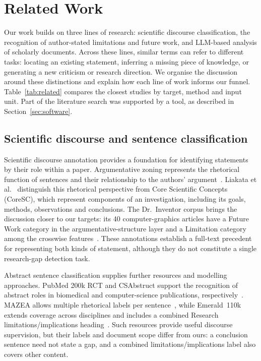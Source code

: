 \section{Related Work}
\label{sec:related}

Our work builds on three lines of research: scientific discourse classification, the recognition of author-stated limitations and future work, and LLM-based analysis of scholarly documents. Across these lines, similar terms can refer to different tasks: locating an existing statement, inferring a missing piece of knowledge, or generating a new criticism or research direction. We organise the discussion around these distinctions and explain how each line of work informs our funnel. Table~\ref{tab:related} compares the closest studies by target, method and input unit. Part of the literature search was supported by a tool, as described in Section~\ref{sec:software}.

\subsection{Scientific discourse and sentence classification}

Scientific discourse annotation provides a foundation for identifying statements by their role within a paper. Argumentative zoning represents the rhetorical function of sentences and their relationship to the authors' argument~\cite{teufel2002summarizing}. Liakata et al.~\cite{liakata2010corpora} distinguish this rhetorical perspective from Core Scientific Concepts (CoreSC), which represent components of an investigation, including its goals, methods, observations and conclusions. The Dr.~Inventor corpus brings the discussion closer to our targets: its 40 computer-graphics articles have a Future Work category in the argumentative-structure layer and a Limitation category among the crosswise features~\cite{fisas2016multilayered}. These annotations establish a full-text precedent for representing both kinds of statement, although they do not constitute a single research-gap detection task.

Abstract sentence classification supplies further resources and modelling approaches. PubMed 200k RCT and CSAbstruct support the recognition of abstract roles in biomedical and computer-science publications, respectively~\cite{dernoncourt2017pubmed,cohan2019pretrained}. MAZEA allows multiple rhetorical labels per sentence~\cite{dayrell2012rhetorical}, while Emerald~110k extends coverage across disciplines and includes a combined Research limitations/implications heading~\cite{stead2019emerald}. Such resources provide useful discourse supervision, but their labels and document scope differ from ours: a conclusion sentence need not state a gap, and a combined limitations/implications label also covers other content.

